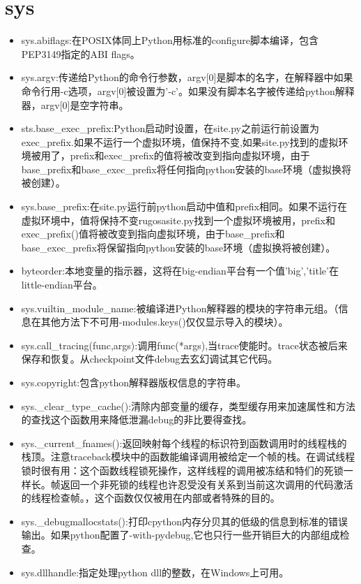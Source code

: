\chapter{sys}
\begin{itemize}
\item sys.abiflags:在POSIX体同上Python用标准的configure脚本编译，包含PEP3149指定的ABI flags。
\item sys.argv:传递给Python的命令行参数，argv[0]是脚本的名字，在解释器中如果命令行用-c选项，argv[0]被设置为'-c'。如果没有脚本名字被传递给python解释器，argv[0]是空字符串。
\item sts.base\_exec\_prefix:Python启动时设置，在site.py之前运行前设置为exec\_prefix.如果不运行一个虚拟环境，值保持不变,如果site.py找到的虚拟环境被用了，prefix和exec\_prefix的值将被改变到指向虚拟环境，由于base\_prefix和base\_exec\_prefix将任何指向python安装的base环境（虚拟换将被创建）。
\item sys.base\_prefix:在site.py运行前python启动中值和prefix相同。如果不运行在虚拟环境中，值将保持不变rugosasite.py找到一个虚拟环境被用，prefix和exec\_prefix()值将被改变到指向虚拟环境，由于base\_prefix和base\_exec\_prefix将保留指向python安装的base环境（虚拟换将被创建）。
\item byteorder:本地变量的指示器，这将在big-endian平台有一个值'big','title'在little-endian平台。
\item sys.vuiltin\_module\_name:被编译进Python解释器的模块的字符串元组。（信息在其他方法下不可用-modules.keys()仅仅显示导入的模块）。
\item sys.call\_tracing(func,args):调用func(*args),当trace使能时。trace状态被后来保存和恢复。从checkpoint文件debug去玄幻调试其它代码。
\item sys.copyright:包含python解释器版权信息的字符串。
\item sys.\_clear\_type\_cache():清除内部变量的缓存，类型缓存用来加速属性和方法的查找这个函数用来降低泄漏debug的非比要得查找。
\item sys.\_current\_fnames():返回映射每个线程的标识符到函数调用时的线程栈的栈顶。注意traceback模块中的函数能编译调用被给定一个帧的栈。在调试线程锁时很有用：这个函数线程锁死操作，这样线程的调用被冻结和特们的死锁一样长。帧返回一个非死锁的线程也许忍受没有关系到当前这次调用的代码激活的线程检查帧。，这个函数仅仅被用在内部或者特殊的目的。
\item sys.\_debugmallocstats():打印cpython内存分贝其的低级的信息到标准的错误输出。如果python配置了-with-pydebug,它也只行一些开销巨大的内部组成检查。
\item sys.dllhandle:指定处理python dll的整数，在Windows上可用。

\end{itemize}
